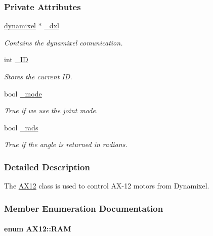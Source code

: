 \subsubsection*{Private Attributes}
\begin{DoxyCompactItemize}
\item 
\hyperlink{a00004}{dynamixel} $\ast$ \hyperlink{a00001_a16df7ccc0a8d3c585a93b6916734bb17}{\+\_\+dxl}
\begin{DoxyCompactList}\small\item\em Contains the dynamixel comunication. \end{DoxyCompactList}\item 
int \hyperlink{a00001_a0ae2b35fee3d120075e1d8f1e2055804}{\+\_\+\+I\+D}
\begin{DoxyCompactList}\small\item\em Stores the current I\+D. \end{DoxyCompactList}\item 
bool \hyperlink{a00001_a2fd07e2e636003227a32d09d211bd6d4}{\+\_\+mode}
\begin{DoxyCompactList}\small\item\em True if we use the joint mode. \end{DoxyCompactList}\item 
bool \hyperlink{a00001_aba71492043d7a3226f0793db57372bec}{\+\_\+rads}
\begin{DoxyCompactList}\small\item\em True if the angle is returned in radians. \end{DoxyCompactList}\end{DoxyCompactItemize}


\subsubsection{Detailed Description}
The \hyperlink{a00001}{A\+X12} class is used to control A\+X-\/12 motors from Dynamixel. 

\subsubsection{Member Enumeration Documentation}
\hypertarget{a00001_a672068c48bbee921e5856cc44b1c81c1}{}
\paragraph[{R\+A\+M}]{\setlength{\rightskip}{0pt plus 5cm}enum {\bf A\+X12\+::\+R\+A\+M}}\label{a00001_a672068c48bbee921e5856cc44b1c81c1}


